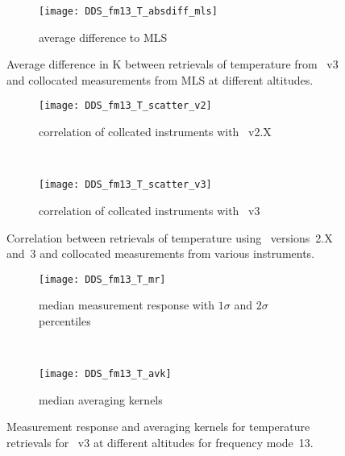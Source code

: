 \begin{figure}[htpb]
    \centering
    \begin{subfigure}[b]{0.49\textwidth}
        \texttt{[image: DDS\_fm13\_T\_absdiff\_mls]}
        \caption{average difference to MLS}
        \label{fig:fm13:T:profiles:MLS}
    \end{subfigure}
    \caption{Average difference in K between retrievals of temperature from
    \smr~v3 and collocated measurements from MLS at different altitudes.}
    \label{fig:fm13:T:profiles}
\end{figure}

\begin{figure}[htpb]
    \centering
    \begin{subfigure}[b]{0.49\textwidth}
        \texttt{[image: DDS\_fm13\_T\_scatter\_v2]}
        \caption{correlation of collcated instruments with \smr~v2.X}
        \label{fig:fm13:T:scatter:v2}
    \end{subfigure}
    \,
    \begin{subfigure}[b]{0.49\textwidth}
        \texttt{[image: DDS\_fm13\_T\_scatter\_v3]}
        \caption{correlation of collcated instruments with \smr~v3}
        \label{fig:fm13:T:scatter:v3}
    \end{subfigure}
    \caption{Correlation between retrievals of temperature using \smr\
    versions~2.X and~3 and collocated measurements from various instruments.}
    \label{fig:fm13:T:scatter}
\end{figure}

\begin{figure}[htpb]
    \centering
    \begin{subfigure}[b]{0.49\textwidth}
        \texttt{[image: DDS\_fm13\_T\_mr]}
        \caption{median measurement response with $1\sigma$ and $2\sigma$
        percentiles}
        \label{fig:fm13:T:mr}
    \end{subfigure}
    \,
    \begin{subfigure}[b]{0.49\textwidth}
        \texttt{[image: DDS\_fm13\_T\_avk]}
        \caption{median averaging kernels\newline~}
        \label{fig:fm13:T:avk}
    \end{subfigure}
    \caption{Measurement response and averaging kernels for temperature
    retrievals for \smr~v3 at different altitudes for frequency mode~13.}
    \label{fig:fm13:T:mr_avk}
\end{figure}


